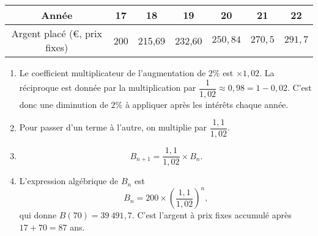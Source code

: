 {			\begin{center}
			\begin{tabular}{|c|c|c|c|c|c|c|}\hline
				Année & 17 & 18 & 19 & 20 & 21 & 22 \\ \hline
				Argent placé (€, prix fixes) & 200 & 215,69 & 232,60 &  \color{red} $250,84$  &  \color{red} $270,5$  &  \color{red} $291,7$   \\ \hline
			\end{tabular}
			\end{center}
 	\begin{enumerate}
		\item 
		Le coefficient multiplicateur de l'augmentation de $2\%$ est $\times1,02$.
		La réciproque est donnée par la multiplication par $\dfrac1{1,02} \approx 0,98 = 1 - 0,02$.
		C'est donc une diminution de $2\%$ à appliquer après les intérêts chaque année.
		\item 
			Pour passer d'un terme à l'autre, on multiplie par $\dfrac{1,1}{1,02}$.
		\item 
			\[ B_{n+1} = \dfrac{1,1}{1,02} \times B_n. \]
		
		\item 
			L'expression algébrique de $B_n$ est 
				\[ B_n = 200 \times \left(\dfrac{1,1}{1,02}\right)^n, \]
			qui donne $B(70) = 39~491,7$.
			C'est l'argent à prix fixes accumulé après $17+70 = 87$ ans.
	\end{enumerate}
 
 
 }
 
 
 
